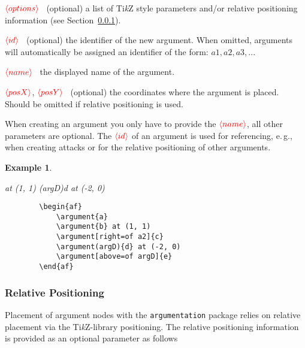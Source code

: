 \documentclass[headings=normal]{scrartcl}
\newcommand{\tikzname}{Ti\emph{k}Z\xspace}
\newcommand{\argumentation}{\texttt{argumentation}\xspace}
\newcommand{\opt}[2][red]{\ensuremath{\textcolor{#1}{\langle #2\rangle}}}
\newtheorem{example}{Example}
\begin{document}
    \begin{list}{}{\leftmargin=\parindent\rightmargin=0pt}
        \item\opt{options}~ (optional) a list of \tikzname style parameters and/or relative positioning information (see Section~\ref{sec:relpos}).
        \item\opt{id}~ (optional) the identifier of the new argument. When omitted, arguments will automatically be assigned an identifier of the form: $a1, a2, a3,...$
        \item\opt{name}~ the displayed name of the argument.
        \item\opt{posX}, \opt{posY}~ (optional) the coordinates where the argument is placed. Should be omitted if relative positioning is used.
        
        \item When creating an argument you only have to provide the \opt{name}, all other parameters are optional.
        The \opt{id} of an argument is used for referencing, e.\,g., when creating attacks or for the relative positioning of other arguments.
    \end{list}

\begin{example}~

    \begin{minipage}{0.35\textwidth}
    \begin{center}
        \begin{af}
             at (1, 1)
            \argument(argD){d} at (-2, 0)
        \end{af}
    \end{center}
    \end{minipage}
    \begin{minipage}{0.5\textwidth}
    \begin{verbatim}
        \begin{af}
            \argument{a}
            \argument{b} at (1, 1)
            \argument[right=of a2]{c}
            \argument(argD){d} at (-2, 0)
            \argument[above=of argD]{e}
        \end{af}
    \end{verbatim}
    \end{minipage}%
\end{example}

\subsubsection{Relative Positioning}\label{sec:relpos}
    Placement of argument nodes with the \argumentation package relies on relative placement via the \tikzname-library \textsf{positioning}.
    The relative positioning information is provided as an optional parameter as follows\\
\end{document}
